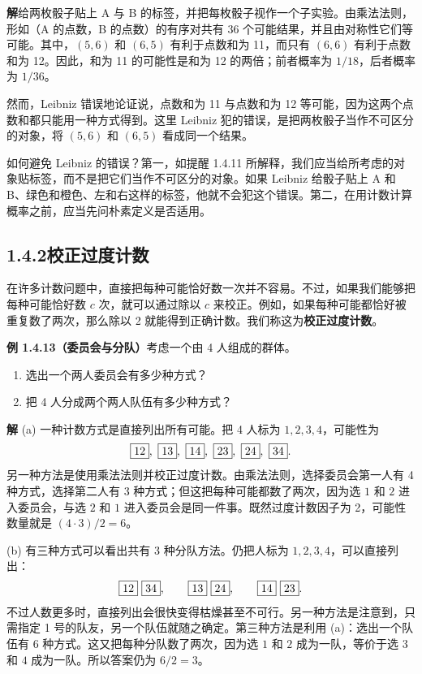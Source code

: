 \documentclass[UTF8, 12pt, fontset=fandol, oneside]{ctexart}
\begin{document}
\noindent\textbf{解}\quad 给两枚骰子贴上 A 与 B 的标签，并把每枚骰子视作一个子实验。由乘法法则，形如（A 的点数，B 的点数）的有序对共有 36 个可能结果，并且由对称性它们等可能。其中，$(5,6)$ 和 $(6,5)$ 有利于点数和为 11，而只有 $(6,6)$ 有利于点数和为 12。因此，和为 11 的可能性是和为 12 的两倍；前者概率为 $1/18$，后者概率为 $1/36$。

然而，Leibniz 错误地论证说，点数和为 11 与点数和为 12 等可能，因为这两个点数和都只能用一种方式得到。这里 Leibniz 犯的错误，是把两枚骰子当作不可区分的对象，将 $(5,6)$ 和 $(6,5)$ 看成同一个结果。

如何避免 Leibniz 的错误？第一，如提醒 1.4.11 所解释，我们应当给所考虑的对象贴标签，而不是把它们当作不可区分的对象。如果 Leibniz 给骰子贴上 A 和 B、绿色和橙色、左和右这样的标签，他就不会犯这个错误。第二，在用计数计算概率之前，应当先问朴素定义是否适用。

\subsection*{1.4.2\quad 校正过度计数}

在许多计数问题中，直接把每种可能恰好数一次并不容易。不过，如果我们能够把每种可能恰好数 $c$ 次，就可以通过除以 $c$ 来校正。例如，如果每种可能都恰好被重复数了两次，那么除以 2 就能得到正确计数。我们称这为\textbf{校正过度计数}。

\noindent\textbf{例 1.4.13（委员会与分队）}\quad 考虑一个由 4 人组成的群体。
\begin{enumerate}
  \item[(a)] 选出一个两人委员会有多少种方式？
  \item[(b)] 把 4 人分成两个两人队伍有多少种方式？
\end{enumerate}

\noindent\textbf{解}\quad
(a) 一种计数方式是直接列出所有可能。把 4 人标为 $1,2,3,4$，可能性为
\[
  \fbox{12},\ \fbox{13},\ \fbox{14},\ \fbox{23},\ \fbox{24},\ \fbox{34}.
\]
另一种方法是使用乘法法则并校正过度计数。由乘法法则，选择委员会第一人有 4 种方式，选择第二人有 3 种方式；但这把每种可能都数了两次，因为选 $1$ 和 $2$ 进入委员会，与选 $2$ 和 $1$ 进入委员会是同一件事。既然过度计数因子为 2，可能性数量就是 $(4\cdot 3)/2=6$。

(b) 有三种方式可以看出共有 3 种分队方法。仍把人标为 $1,2,3,4$，可以直接列出：
\[
  \fbox{12}\ \fbox{34},\qquad
  \fbox{13}\ \fbox{24},\qquad
  \fbox{14}\ \fbox{23}.
\]
不过人数更多时，直接列出会很快变得枯燥甚至不可行。另一种方法是注意到，只需指定 1 号的队友，另一个队伍就随之确定。第三种方法是利用 (a)：选出一个队伍有 6 种方式。这又把每种分队数了两次，因为选 $1$ 和 $2$ 成为一队，等价于选 $3$ 和 $4$ 成为一队。所以答案仍为 $6/2=3$。
\end{document}
